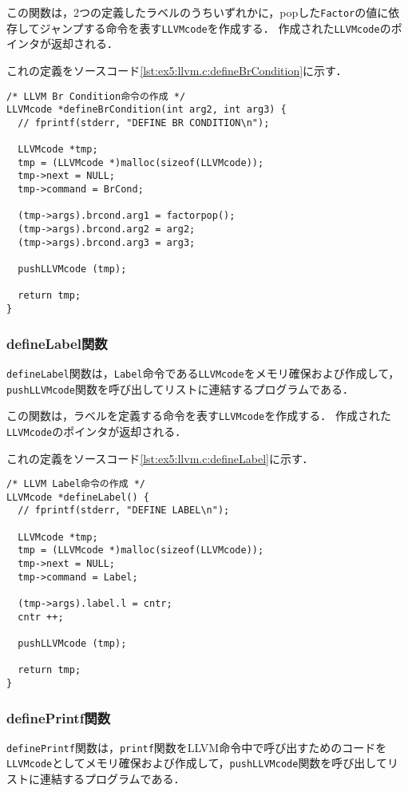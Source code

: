 \documentclass[uplatex]{jsarticle}
\begin{document}
この関数は，2つの定義したラベルのうちいずれかに，popした\verb#Factor#の値に依存してジャンプする命令を表す\verb#LLVMcode#を作成する．
作成された\verb#LLVMcode#のポインタが返却される．

これの定義をソースコード\ref{lst:ex5:llvm.c:defineBrCondition}に示す．

\begin{lstlisting}[caption=defineCondition関数の定義,label=lst:ex5:llvm.c:defineBrCondition]
/* LLVM Br Condition命令の作成 */
LLVMcode *defineBrCondition(int arg2, int arg3) {
  // fprintf(stderr, "DEFINE BR CONDITION\n");

  LLVMcode *tmp;
  tmp = (LLVMcode *)malloc(sizeof(LLVMcode));
  tmp->next = NULL;
  tmp->command = BrCond;

  (tmp->args).brcond.arg1 = factorpop();
  (tmp->args).brcond.arg2 = arg2;
  (tmp->args).brcond.arg3 = arg3;

  pushLLVMcode (tmp);

  return tmp;
}
\end{lstlisting}


\subsubsection{defineLabel関数}
\verb#defineLabel#関数は，\verb#Label#命令である\verb#LLVMcode#をメモリ確保および作成して，\verb#pushLLVMcode#関数を呼び出してリストに連結するプログラムである．

この関数は，ラベルを定義する命令を表す\verb#LLVMcode#を作成する．
作成された\verb#LLVMcode#のポインタが返却される．

これの定義をソースコード\ref{lst:ex5:llvm.c:defineLabel}に示す．

\begin{lstlisting}[caption=defineLabel関数の定義,label=lst:ex5:llvm.c:defineLabel]
/* LLVM Label命令の作成 */
LLVMcode *defineLabel() {
  // fprintf(stderr, "DEFINE LABEL\n");

  LLVMcode *tmp;
  tmp = (LLVMcode *)malloc(sizeof(LLVMcode));
  tmp->next = NULL;
  tmp->command = Label;

  (tmp->args).label.l = cntr;
  cntr ++;

  pushLLVMcode (tmp);

  return tmp;
}

\end{lstlisting}

\subsubsection{definePrintf関数}
\verb#definePrintf#関数は，\verb#printf#関数をLLVM命令中で呼び出すためのコードを\verb#LLVMcode#としてメモリ確保および作成して，\verb#pushLLVMcode#関数を呼び出してリストに連結するプログラムである．
\end{document}
